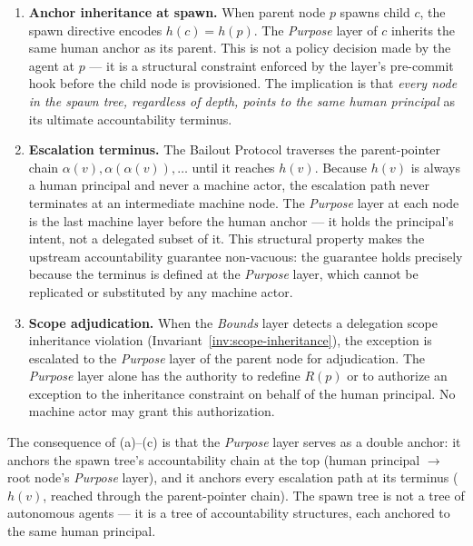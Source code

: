 \begin{enumerate}
\item[(a)] \textbf{Anchor inheritance at spawn.}  When parent node $p$ spawns child
$c$, the spawn directive encodes $h(c) = h(p)$.  The \textit{Purpose} layer of
$c$ inherits the same human anchor as its parent.  This is not a policy decision
made by the agent at $p$ — it is a structural constraint enforced by the
\fact{} layer's pre-commit hook before the child node is provisioned.  The
implication is that \textit{every node in the spawn tree, regardless of depth,
points to the same human principal} as its ultimate accountability terminus.

\item[(b)] \textbf{Escalation terminus.}  The Bailout Protocol traverses the
parent-pointer chain $\alpha(v), \alpha(\alpha(v)), \ldots$ until it reaches
$h(v)$.  Because $h(v)$ is always a human principal and never a machine actor,
the escalation path never terminates at an intermediate machine node.  The
\textit{Purpose} layer at each node is the last machine layer before the human
anchor — it holds the principal's intent, not a delegated subset of it.  This
structural property makes the upstream accountability guarantee non-vacuous: the
guarantee holds precisely because the terminus is defined at the \textit{Purpose}
layer, which cannot be replicated or substituted by any machine actor.

\item[(c)] \textbf{Scope adjudication.}  When the \textit{Bounds} layer detects
a delegation scope inheritance violation (Invariant~\ref{inv:scope-inheritance}),
the exception is escalated to the \textit{Purpose} layer of the parent node for
adjudication.  The \textit{Purpose} layer alone has the authority to redefine
$R(p)$ or to authorize an exception to the inheritance constraint on behalf of
the human principal.  No machine actor may grant this authorization.
\end{enumerate}

The consequence of (a)–(c) is that the \textit{Purpose} layer serves as a
double anchor: it anchors the spawn tree's accountability chain at the top
(human principal $\rightarrow$ root node's \textit{Purpose} layer), and it
anchors every escalation path at its terminus ($h(v)$, reached through the
parent-pointer chain).  The spawn tree is not a tree of autonomous agents — it
is a tree of accountability structures, each anchored to the same human principal.

